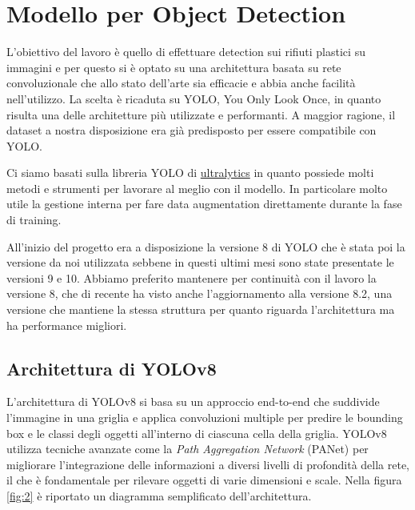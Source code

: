 \section{Modello per Object Detection}

L'obiettivo del lavoro è quello di effettuare detection sui rifiuti plastici
su immagini e per questo si è optato su una architettura basata su rete convoluzionale che allo stato dell'arte sia efficacie e abbia anche 
facilità nell'utilizzo. La scelta è ricaduta su YOLO, You Only Look Once, in
quanto risulta una delle architetture più utilizzate e performanti.
A maggior ragione, il dataset a nostra disposizione era già predisposto per 
essere compatibile con YOLO.

Ci siamo basati sulla libreria YOLO di \href{https://docs.ultralytics.com/}{ultralytics} in quanto possiede molti metodi e strumenti per lavorare al meglio con il modello. In particolare molto utile la gestione interna per 
fare data augmentation direttamente durante la fase di training.

All'inizio del progetto era a disposizione la versione 8 di YOLO che è stata
poi la versione da noi utilizzata sebbene in questi ultimi mesi sono state 
presentate le versioni 9 e 10. Abbiamo preferito mantenere per continuità con il lavoro la versione 8, che di recente ha visto anche l'aggiornamento
alla versione 8.2, una versione che mantiene la stessa struttura per quanto
riguarda l'architettura ma ha performance migliori.



\subsection*{Architettura di YOLOv8}

L'architettura di YOLOv8 si basa su un approccio end-to-end che suddivide l'immagine in una griglia e applica convoluzioni multiple per predire le bounding box e le classi degli oggetti all'interno di ciascuna cella della griglia. YOLOv8 utilizza tecniche avanzate come la \textit{Path Aggregation Network} (PANet) per migliorare l'integrazione delle informazioni a diversi livelli di profondità della rete, il che è fondamentale per rilevare oggetti di varie dimensioni e scale. Nella figura \ref*{fig:2} è riportato un diagramma semplificato dell'architettura.

